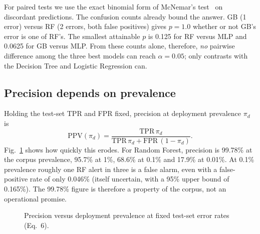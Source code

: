 \documentclass[conference]{IEEEtran}
\begin{document}
For paired tests we use the exact binomial form of McNemar's test~\cite{mcnemar47,dietterich98} on discordant predictions. The confusion counts already bound the answer. GB (1 error) versus RF (2 errors, both false positives) gives $p=1.0$ whether or not GB's error is one of RF's. The smallest attainable $p$ is 0.125 for RF versus MLP and 0.0625 for GB versus MLP. From these counts alone, therefore, \emph{no} pairwise difference among the three best models can reach $\alpha=0.05$; only contrasts with the Decision Tree and Logistic Regression can.

\subsection{Precision depends on prevalence}
Holding the test-set TPR and FPR fixed, precision at deployment prevalence $\pi_d$ is
\begin{equation}
\text{PPV}(\pi_d)=\frac{\text{TPR}\,\pi_d}{\text{TPR}\,\pi_d+\text{FPR}\,(1-\pi_d)}.
\end{equation}
Fig.~\ref{fig:ppv} shows how quickly this erodes. For Random Forest, precision is 99.78\% at the corpus prevalence, 95.7\% at 1\%, 68.6\% at 0.1\% and 17.9\% at 0.01\%. At 0.1\% prevalence roughly one RF alert in three is a false alarm, even with a false-positive rate of only 0.046\% (itself uncertain, with a 95\% upper bound of 0.165\%). The 99.78\% figure is therefore a property of the corpus, not an operational promise.

\begin{figure}[!t]
\centering
{}
\caption{Precision versus deployment prevalence at fixed test-set error rates (Eq.~6).}
\label{fig:ppv}
\end{figure}
\end{document}
